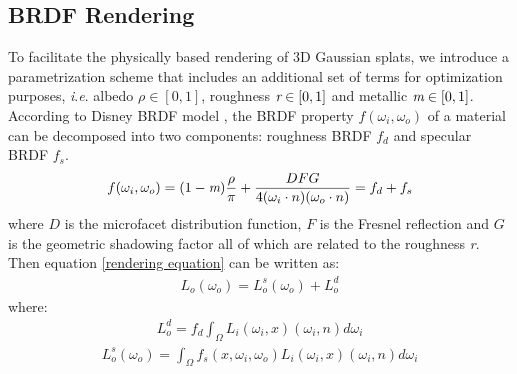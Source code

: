 \subsection{BRDF Rendering} \label{4.2}
To facilitate the physically based rendering of 3D Gaussian splats, we introduce a parametrization scheme that includes an additional set of terms for optimization purposes, \emph{i}.\emph{e}. albedo $\rho \in [0,1]$, roughness $\emph{r} \in [0,1]$ and metallic $\emph{m} \in [0,1]$. According to Disney BRDF model \cite{burley2012physically}, the BRDF property $f(\omega_i,\omega_o)$ of a material can be decomposed into two components: roughness BRDF $f_d$ and specular BRDF $f_s$.
\begin{align}
    f(\omega_i,\omega_o)=(1-\emph{m})\frac{\rho}{\pi}+\frac{DFG}{4(\omega_i \cdot n)(\omega_o \cdot n)}=f_d+f_s
\end{align}
where $D$ is the microfacet distribution function, $F$ is the Fresnel reflection and $G$ is the geometric shadowing factor all of which are related to the roughness \emph{r}.
Then equation \ref{rendering equation} can be written as:
\begin{align}
    L_o(\omega_o)=L_o^s(\omega_o)+L_o^d
\end{align}
where:
\begin{align}
    L_o^d=f_d\int_{\Omega}L_i(\omega_i,x)(\omega_i,n)d\omega_i
\end{align}
\begin{align}
    L_o^s(\omega_o)=\int_{\Omega}f_s(x,\omega_i,\omega_o)L_i(\omega_i,x)(\omega_i,n)d\omega_i
\end{align}
